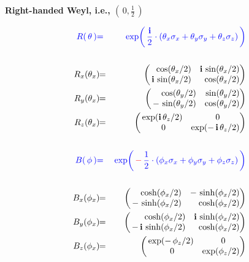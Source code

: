 \begin{frame}{\headingColor\bf\LARGE}
\begin{multicols}{2}
\columnbreak

	\begin{minipage}{7cm}
	\begin{center}
	\vskip -0.75cm
	\textbf{\large Right-handed Weyl, i.e., $\left(\,0,\frac{1}{2}\,\right)$}
	\end{center}
	\vskip -0.3cm
	\begin{eqnarray*}
	{\color{blue}R(\,\mathbf{\theta}\,)}
	& {\color{blue}=} &
		{\color{blue}\exp\!\left(\,\frac{\i}{2}\cdot(\theta_{x}\sigma_{x}+\theta_{y}\sigma_{y}+\theta_{z}\sigma_{z})\,\right)}
	\\ \\
	R_{x}(\theta_{x})\!\!
	& = &
		\!\!\left(\!\!\begin{array}{rr} \cos(\theta_{x}/2) & \i\,\sin(\theta_{x}/2) \\ \i\,\sin(\theta_{x}/2) & \cos(\theta_{x}/2) \end{array}\!\!\!\right)
	\\
	R_{y}(\theta_{x})\!\!
	& = &
		\!\!\left(\!\!\begin{array}{rr} \cos(\theta_{y}/2) & \sin(\theta_{y}/2) \\ -\,\sin(\theta_{y}/2) & \cos(\theta_{y}/2) \end{array}\!\!\!\right)
	\\
	R_{z}(\theta_{x})\!\!
	& = &
		\!\!\left(\!\!\begin{array}{cc} \exp(\i\,\theta_{z}/2) & {\color{white}..}0 \\ {\color{white}.}0 & \exp(-\,\i\,\theta_{z}/2) \end{array}\!\!\!\right)
	\\ \\
	{\color{blue}B(\,\mathbf{\phi}\,)}
	& {\color{blue}=} &
		{\color{blue}\exp\!\left(\,{\color{red}-}\,\frac{1}{2}\cdot(\phi_{x}\sigma_{x}+\phi_{y}\sigma_{y}+\phi_{z}\sigma_{z})\,\right)}
	\\ \\
	B_{x}(\phi_{x})\!\!
	& = &
		\!\!\left(\!\!\begin{array}{rr} \cosh(\phi_{x}/2) & -\,\sinh(\phi_{x}/2) \\ -\,\sinh(\phi_{x}/2) & \cosh(\phi_{x}/2) \end{array}\!\!\!\right)
	\\
	B_{y}(\phi_{x})\!\!
	& = &
		\!\!\left(\!\!\begin{array}{rr} \cosh(\phi_{x}/2) & \i\,\sinh(\phi_{x}/2) \\ -\,\i\,\sinh(\phi_{x}/2) & \cosh(\phi_{x}/2) \end{array}\!\!\!\right)
	\\
	B_{z}(\phi_{x})\!\!
	&=&
		\!\!\left(\!\!\begin{array}{cc} \exp(-\,\phi_{z}/2) & {\color{white}..}0 \\ {\color{white}.}0 & \exp(\phi_{z}/2) \end{array}\!\!\!\right)
	\end{eqnarray*}
	\end{minipage}

\end{multicols}

\end{frame}
\normalsize

